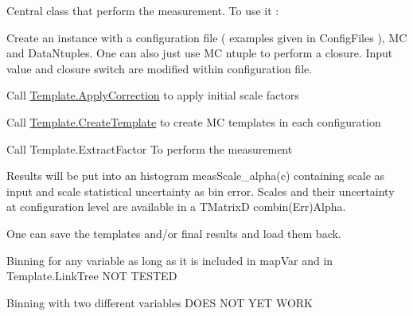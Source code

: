 Central class that perform the measurement. To use it \+:
\begin{DoxyItemize}
\item Create an instance with a configuration file ( examples given in Config\+Files ), M\+C and Data\+Ntuples. One can also just use M\+C ntuple to perform a closure. Input value and closure switch are modified within configuration file.
\item Call \hyperlink{classTemplateMethod_1_1Template_af7a98edbce0b7dde939d43ca4b82f9cd}{Template.\+Apply\+Correction} to apply initial scale factors
\item Call \hyperlink{classTemplateMethod_1_1Template_a2e229b812199e36c2b3360cc9a449333}{Template.\+Create\+Template} to create M\+C templates in each configuration
\item Call Template.\+Extract\+Factor To perform the measurement
\end{DoxyItemize}

Results will be put into an histogram meas\+Scale\+\_\+alpha(c) containing scale as input and scale statistical uncertainty as bin error. Scales and their uncertainty at configuration level are available in a T\+Matrix\+D combin(\+Err)Alpha.

One can save the templates and/or final results and load them back.

Binning for any variable as long as it is included in map\+Var and in Template.\+Link\+Tree N\+O\+T T\+E\+S\+T\+E\+D

Binning with two different variables D\+O\+E\+S N\+O\+T Y\+E\+T W\+O\+R\+K 

